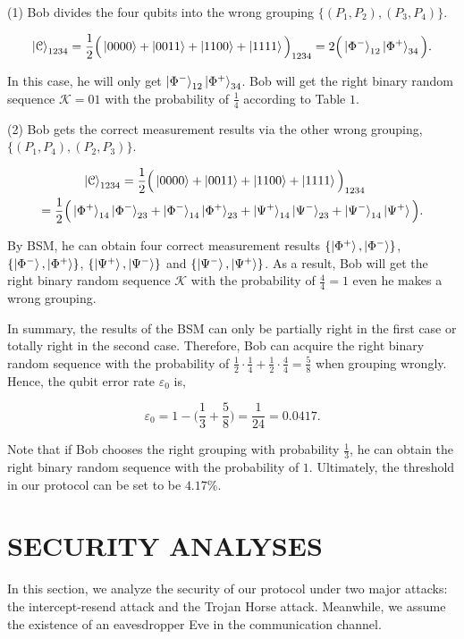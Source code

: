 \documentclass[a4paper,11pt]{article}
\begin{document}
(1) Bob divides the four qubits into the wrong grouping $\{(P_1 , P_2), (P_3 , P_4)\}$.

\begin{equation*}
\ket{\mathcal{C}}_{1234} = \dfrac{1}{2} \Big(\ket{0000} + \ket{0011}
 + \ket{1100} + \ket{1111} \Big)_{1234} = 2 \Big(\ket{\Phi^-}_{12} \ket{\Phi^+}_{34}\Big).
\end{equation*}

In this case, he will only get $\ket{\Phi^-}_{12} \ket{\Phi^+}_{34}$. Bob will get the right binary random sequence $\mathcal{K} = 01$ with the probability of $\frac{1}{4}$ according to Table $1$.

(2) Bob gets the correct measurement results via the other wrong grouping, $\{(P_1, P_4), (P_2, P_3)\}$.

\begin{align*}
\ket{\mathcal{C}}_{1234} = \dfrac{1}{2} \Big(\ket{0000} + \ket{0011}
&+ \ket{1100} + \ket{1111} \Big)_{1234} \nonumber\\
 = \dfrac{1}{2} \Big(
\ket{\Phi^+}_{14} \ket{\Phi^-}_{23} + \ket{\Phi^-}_{14} \ket{\Phi^+}_{23} &+ 
\ket{\Psi^+}_{14} \ket{\Psi^-}_{23} + \ket{\Psi^-}_{14} \ket{\Psi^+} \Big).
\end{align*}

By BSM, he can obtain four correct measurement results $\{\ket{\Phi^+}, \ket{\Phi^-}\}$, $\{\ket{\Phi^-}, \ket{\Phi^+}\}$, $\{\ket{\Psi^+}, \ket{\Psi^-}\}$ and $\{\ket{\Psi^-}, \ket{\Psi^+}\}$. As a result, Bob will get the right binary random sequence $\mathcal{K}$ with the probability of $\frac{4}{4} = 1$ even he makes a wrong grouping.

In summary, the results of the BSM can only be partially right in the first case or totally right in the second case. Therefore, Bob can acquire the right binary random sequence
with the probability of $\frac{1}{2} \cdot \frac{1}{4} + \frac{1}{2} \cdot \frac{4}{4} = \frac{5}{8}$ when grouping wrongly. Hence, the qubit error rate $\varepsilon_0$ is,

\begin{equation*}
\varepsilon_0 = 1 - \Big(\dfrac{1}{3} + \dfrac{5}{8}\Big) = \dfrac{1}{24} = 0.0417.
\end{equation*}

Note that if Bob chooses the right grouping with probability $\frac{1}{3}$, he can obtain the right binary random sequence with the probability of $1$. Ultimately, the threshold in our protocol can be set to be $4.17\%$.

\section{SECURITY ANALYSES}
In this section, we analyze the security of our protocol under two major attacks: the intercept-resend attack and the Trojan Horse attack. Meanwhile, we assume the existence of
an eavesdropper Eve in the communication channel.
\end{document}
